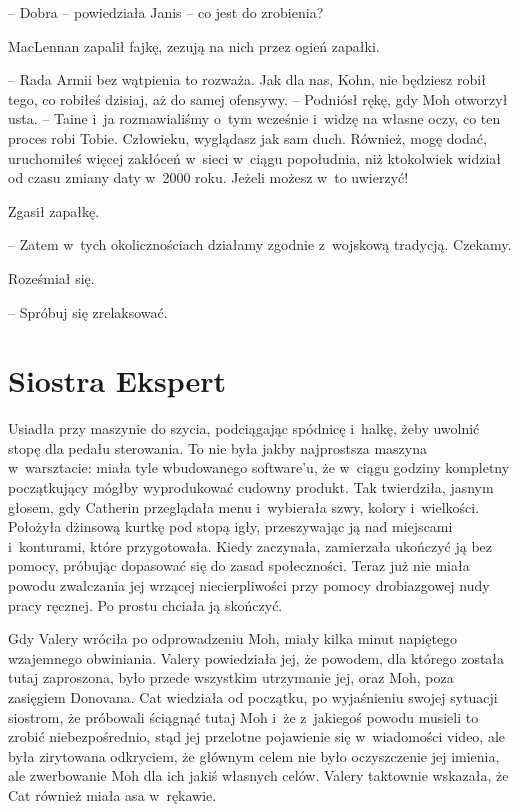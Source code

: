 \documentclass[oneside,polish,11pt,sfheadings]{mwbk}
\begin{document}
-- Dobra -- powiedziała Janis -- co jest do zrobienia?

MacLennan zapalił fajkę, zezują na nich przez ogień zapałki. 

-- Rada
Armii bez wątpienia to rozważa. Jak dla nas, Kohn, nie będziesz robił
tego, co robiłeś dzisiaj, aż do samej ofensywy. -- Podniósł rękę, gdy Moh
otworzył usta. -- Taine i~ja rozmawialiśmy o~tym wcześnie i~widzę na
własne oczy, co ten proces robi Tobie. Człowieku, wyglądasz jak sam duch.
Również, mogę dodać, uruchomiłeś więcej zakłóceń w~sieci w~ciągu
popołudnia, niż ktokolwiek widział od czasu zmiany daty w~2000 roku.
Jeżeli możesz w~to uwierzyć!

Zgasił zapałkę. 

-- Zatem w~tych okolicznościach działamy zgodnie z~wojskową tradycją. Czekamy.

Roześmiał się. 

-- Spróbuj się zrelaksować.

\chapter{Siostra Ekspert}

Usiadła przy maszynie do szycia, podciągając spódnicę i~halkę, żeby
uwolnić stopę dla pedału sterowania. To nie była jakby najprostsza
maszyna w~warsztacie: miała tyle wbudowanego software'u, że w~ciągu
godziny kompletny początkujący mógłby wyprodukować cudowny produkt. Tak
twierdziła, jasnym głosem, gdy Catherin przeglądała menu i~wybierała
szwy, kolory i~wielkości. Położyła dżinsową kurtkę pod stopą igły,
przeszywając ją nad miejscami i~konturami, które przygotowała. Kiedy
zaczynała, zamierzała ukończyć ją bez pomocy, próbując dopasować się do
zasad społeczności. Teraz już nie miała powodu zwalczania jej wrzącej
niecierpliwości przy pomocy drobiazgowej nudy pracy ręcznej. Po prostu
chciała ją skończyć.

Gdy Valery wróciła po odprowadzeniu Moh, miały kilka minut napiętego
wzajemnego obwiniania. Valery powiedziała jej, że powodem, dla którego
została tutaj zaproszona, było przede wszystkim utrzymanie jej, oraz
Moh, poza zasięgiem Donovana. Cat wiedziała od początku, po wyjaśnieniu
swojej sytuacji siostrom, że próbowali ściągnąć tutaj Moh i~że z~jakiegoś powodu musieli to zrobić niebezpośrednio, stąd jej przelotne
pojawienie się w~wiadomości video, ale była zirytowana odkryciem, że
głównym celem nie było oczyszczenie jej imienia, ale zwerbowanie Moh dla
ich jakiś własnych celów. Valery taktownie wskazała, że Cat również
miała asa w~rękawie.
\end{document}
